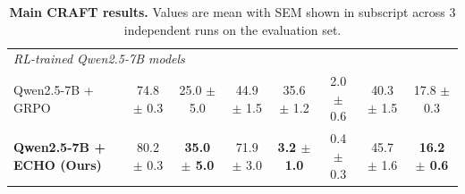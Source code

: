 \documentclass[11pt]{article}
\theoremstyle{plain}
\theoremstyle{definition}
\theoremstyle{remark}
\begin{document}
\begin{table}[t]
{\begin{tabular}{lccccccc}
\midrule
\multicolumn{8}{l}{\textit{RL-trained Qwen2.5-7B models}} \\
\hdashline

Qwen2.5-7B + GRPO
& 74.8 $\pm$ 0.3
& 25.0 $\pm$ 5.0
& 44.9 $\pm$ 1.5
& 35.6 $\pm$ 1.2
& 2.0 $\pm$ 0.6
& 40.3 $\pm$ 1.5
& 17.8 $\pm$ 0.3 \\

\rowcolor{echoshade}
\textbf{Qwen2.5-7B + \textsc{ECHO} (Ours)}
& 80.2 $\pm$ 0.3
& \textbf{35.0 $\pm$ 5.0}
& 71.9 $\pm$ 3.0
& \textbf{3.2 $\pm$ 1.0}
& 0.4 $\pm$ 0.3
& 45.7 $\pm$ 1.6
& \textbf{16.2 $\pm$ 0.6} \\

\bottomrule
\end{tabular}
}
\caption{
\textbf{Main CRAFT results.}
Values are mean with SEM shown in subscript across 3 independent runs on the
evaluation set.
}
\label{tab:craft_results}
\end{table}

 


%


\end{document}
